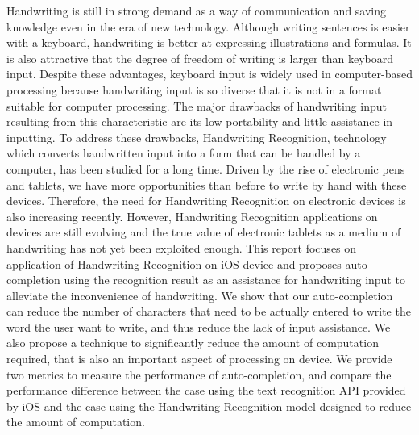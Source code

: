 Handwriting is still in strong demand as a way of communication and saving knowledge
even in the era of new technology. Although writing sentences is easier with a keyboard,
handwriting is better at expressing illustrations and formulas. It is also attractive
that the degree of freedom of writing is larger than keyboard input.
Despite these advantages, keyboard input is widely used in computer-based processing because
handwriting input is so diverse that it is not in a format suitable for computer processing.
The major drawbacks of handwriting input resulting from this characteristic are its low
portability and little assistance in inputting. To address these drawbacks,
Handwriting Recognition, technology which converts handwritten input into a form that
can be handled by a computer, has been studied for a long time.
Driven by the rise of electronic pens and tablets, we have more opportunities than before to
write by hand with these devices.
Therefore, the need for Handwriting Recognition on electronic devices is also increasing recently.
However, Handwriting Recognition applications on devices are still evolving
and the true value of electronic tablets as a medium of
handwriting has not yet been exploited enough.
This report focuses on application of Handwriting Recognition on iOS device and proposes
auto-completion using the recognition result as an assistance for handwriting input
to alleviate the inconvenience of handwriting. We show that our auto-completion can
reduce the number of characters that need to be actually entered to write the word the user want
to write, and thus reduce the lack of input assistance. We also propose a technique to significantly reduce
the amount of computation required, that is also an important aspect of processing on device.
We provide two metrics to measure the
performance of auto-completion, and compare the performance difference between the case
using the text recognition API provided by iOS and the case using the Handwriting Recognition model
designed to reduce the amount of computation.
